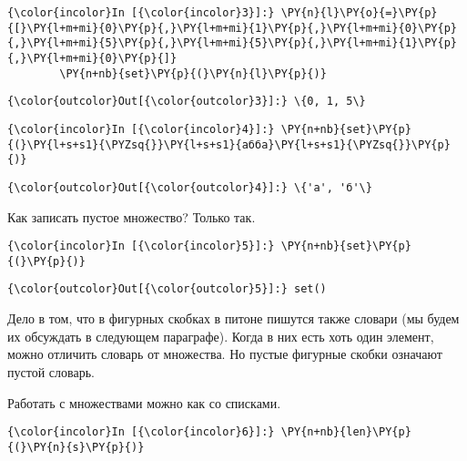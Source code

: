     \begin{Verbatim}[commandchars=\\\{\}]
{\color{incolor}In [{\color{incolor}3}]:} \PY{n}{l}\PY{o}{=}\PY{p}{[}\PY{l+m+mi}{0}\PY{p}{,}\PY{l+m+mi}{1}\PY{p}{,}\PY{l+m+mi}{0}\PY{p}{,}\PY{l+m+mi}{5}\PY{p}{,}\PY{l+m+mi}{5}\PY{p}{,}\PY{l+m+mi}{1}\PY{p}{,}\PY{l+m+mi}{0}\PY{p}{]}
        \PY{n+nb}{set}\PY{p}{(}\PY{n}{l}\PY{p}{)}
\end{Verbatim}

            \begin{Verbatim}[commandchars=\\\{\}]
{\color{outcolor}Out[{\color{outcolor}3}]:} \{0, 1, 5\}
\end{Verbatim}
        
    \begin{Verbatim}[commandchars=\\\{\}]
{\color{incolor}In [{\color{incolor}4}]:} \PY{n+nb}{set}\PY{p}{(}\PY{l+s+s1}{\PYZsq{}}\PY{l+s+s1}{абба}\PY{l+s+s1}{\PYZsq{}}\PY{p}{)}
\end{Verbatim}

            \begin{Verbatim}[commandchars=\\\{\}]
{\color{outcolor}Out[{\color{outcolor}4}]:} \{'а', 'б'\}
\end{Verbatim}
        
    Как записать пустое множество? Только так.

    \begin{Verbatim}[commandchars=\\\{\}]
{\color{incolor}In [{\color{incolor}5}]:} \PY{n+nb}{set}\PY{p}{(}\PY{p}{)}
\end{Verbatim}

            \begin{Verbatim}[commandchars=\\\{\}]
{\color{outcolor}Out[{\color{outcolor}5}]:} set()
\end{Verbatim}
        
    Дело в том, что в фигурных скобках в питоне пишутся также словари (мы
будем их обсуждать в следующем параграфе). Когда в них есть хоть один
элемент, можно отличить словарь от множества. Но пустые фигурные скобки
означают пустой словарь.

Работать с множествами можно как со списками.

    \begin{Verbatim}[commandchars=\\\{\}]
{\color{incolor}In [{\color{incolor}6}]:} \PY{n+nb}{len}\PY{p}{(}\PY{n}{s}\PY{p}{)}
\end{Verbatim}

